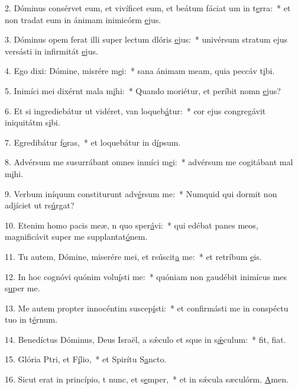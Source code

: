 2. Dóminus consérvet eum, et vivíficet eum, et beátum fáciat um in t\uline{e}rra:~* et non tradat eum in ánimam inimicórm \uline{e}jus.\par 
3. Dóminus opem ferat illi super lectum dlóris \uline{e}jus:~* univérsum stratum ejus versásti in infirmitát \uline{e}jus.\par 
4. Ego dixi: Dómine, misrére m\uline{e}i:~* sana ánimam meam, quia peccáv t\uline{i}bi.\par 
5. Inimíci mei dixérnt mala m\uline{i}hi:~* Quando moriétur, et períbit nomn \uline{e}jus?\par 
6. Et si ingrediebátur ut vidéret, van loqueb\uline{á}tur:~* cor ejus congregávit iniquitátm s\uline{i}bi.\par 
7. Egredibátur f\uline{o}ras,~* et loquebátur in d\uline{í}psum.\par 
8. Advérsum me susurrábant omnes inmíci m\uline{e}i:~* advérsum me cogitábant mal m\uline{i}hi.\par 
9. Verbum iníquum constiturunt adv\uline{é}rsum me:~* Numquid qui dormit non adjíciet ut rs\uline{ú}rgat?\par 
10. Etenim homo pacis meæ, n quo sper\uline{á}vi:~* qui edébat panes meos, magnificávit super me supplantat\uline{ó}nem.\par 
11. Tu autem, Dómine, miserére mei, et rsúscit\uline{a} me:~* et retríbum \uline{e}is.\par 
12. In hoc cognóvi quónim volu\uline{í}sti me:~* quóniam non gaudébit inimícus mes s\uline{u}per me.\par 
13. Me autem propter innocéntim suscep\uline{í}sti:~* et confirmásti me in conspéctu tuo in t\uline{é}rnum.\par 
14. Benedíctus Dóminus, Deus Israël, a sǽculo et sque in s\uline{ǽ}culum:~* fit, f\uline{i}at.\par 
15. Glória Ptri, et F\uline{í}lio,~* et Spirítu S\uline{a}ncto.\par 
16. Sicut erat in princípio, t nunc, et s\uline{e}mper,~* et in sǽcula sæculórm. \uline{A}men.\par 
